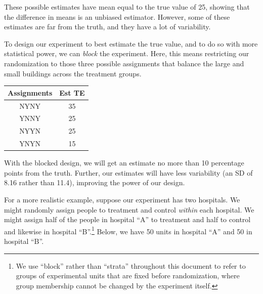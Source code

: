 \documentclass[
  12pt,
]{book}
\newenvironment{Shaded}{\begin{snugshade}}{\end{snugshade}}
\newcommand{\DataTypeTok}[1]{\textcolor[rgb]{0.13,0.29,0.53}{#1}}
\newcommand{\DecValTok}[1]{\textcolor[rgb]{0.00,0.00,0.81}{#1}}
\newcommand{\KeywordTok}[1]{\textcolor[rgb]{0.13,0.29,0.53}{\textbf{#1}}}
\newcommand{\NormalTok}[1]{#1}
\newcommand{\OperatorTok}[1]{\textcolor[rgb]{0.81,0.36,0.00}{\textbf{#1}}}
\newcommand{\StringTok}[1]{\textcolor[rgb]{0.31,0.60,0.02}{#1}}
\theoremstyle{definition}
\theoremstyle{definition}
\theoremstyle{definition}
\theoremstyle{remark}
\begin{document}
These possible estimates have mean equal to the true value of 25,
showing that the difference in means is an unbiased estimator. However,
some of these estimates are far from the truth, and they have a lot of
variability.

To design our experiment to best estimate the true value, and to do so
with more statistical power, we can \emph{block} the experiment. Here,
this means restricting our randomization to those three possible
assignments that balance the large and small buildings across the
treatment groups.

\begin{center}
\begin{tabular}{cc}
Assignments & Est TE \\ \hline
NYNY & 35 \\
YNNY & 25 \\
NYYN & 25 \\
YNYN & 15 \\
\end{tabular}
\end{center}

With the blocked design, we will get an estimate no more than 10
percentage points from the truth. Further, our estimates will have less
variability (an SD of 8.16 rather than 11.4), improving the power of our
design.

For a more realistic example, suppose our experiment has two hospitals.
We might randomly assign people to treatment and control \emph{within}
each hospital. We might assign half of the people in hospital ``A'' to
treatment and half to control and likewise in hospital ``B''.\footnote{We
  use ``block'' rather than ``strata'' throughout this document to refer
  to groups of experimental units that are fixed before randomization,
  where group membership cannot be changed by the experiment itself.}
Below, we have 50 units in hospital ``A'' and 50 in hospital ``B''.

\begin{Shaded}
\end{Shaded}
\end{document}
